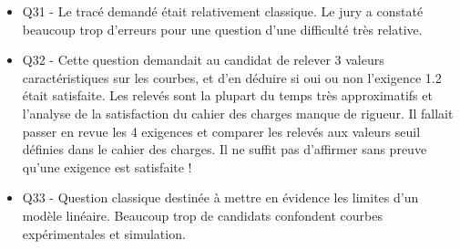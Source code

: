 \documentclass[10pt,fleqn]{article} %
\begin{document}
\begin{itemize}
\item Q31 - Le tracé demandé était relativement classique. Le jury a constaté beaucoup trop d’erreurs pour
une question d’une difficulté très relative.
\item Q32 - Cette question demandait au candidat de relever 3 valeurs caractéristiques sur les courbes,
et d’en déduire si oui ou non l’exigence 1.2 était satisfaite. Les relevés sont la plupart du temps très
approximatifs et l’analyse de la satisfaction du cahier des charges manque de rigueur. Il fallait passer
en revue les 4 exigences et comparer les relevés aux valeurs seuil définies dans le cahier des charges. Il
ne suffit pas d’affirmer sans preuve qu’une exigence est satisfaite !
\item Q33 - Question classique destinée à mettre en évidence les limites d’un modèle linéaire. Beaucoup
trop de candidats confondent courbes expérimentales et simulation.
\end{itemize}
\end{document}

